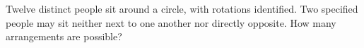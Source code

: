 Twelve distinct people sit around a circle, with rotations identified. Two specified people may sit neither next to one another nor directly opposite. How many arrangements are possible?
